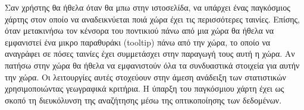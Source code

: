 \begin{tcolorbox}[colback=fg!10!white,colframe=gbg!100!white,
 	title=6η ιστορία]
Σαν χρήστης θα ήθελα όταν θα μπω στην ιστοσελίδα, να υπάρχει ένας παγκόσμιος χάρτης στον οποίο να αναδεικνύεται ποιά χώρα έχει τις περισσότερες ταινίες. Επίσης, όταν μετακινήσω τον κένσορα του ποντικιού πάνω από μια χώρα θα ήθελα να εμφανιστεί ένα μικρο παραθυράκι (tooltip) πάνω από την χώρα, το οποίο να αναγράφει σε πόσες ταινίες έχει συμμετάσχει στην παραγωγή τους αυτή η χώρα. Αν πατήσω στην χώρα θα ήθελα να εμφανιστούν όλα τα συνδυαστικά στοιχεία για αυτήν την χώρα. Οι λειτουργίες αυτές στοχεύουν στην άμεση ανάδειξη των στατιστικών χρησιμοποιώντας γεωγραφικά κριτήρια. Η ύπαρξη του παγκόσμιου χάρτη έχει ως σκοπό τη διευκόλυνση της αναζήτησης μέσω της οπτικοποίησης των δεδομένων.
\end{tcolorbox}
